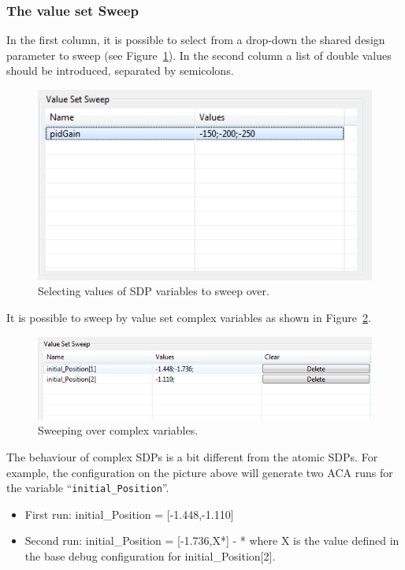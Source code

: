 \documentclass{crescendorepchap}
\begin{document}
\subsubsection{The value set Sweep}

In the first column, it is possible to select from a drop-down the shared
design parameter to sweep (see Figure~\ref{fig:ValueSetSweep}). 
In the second column a list of double values
should be introduced, separated by semicolons.

\begin{figure}[htbp]
\centering
\includegraphics[width=.6\textwidth]{images/ValueSetSweep.png}
\caption{Selecting values of SDP variables to sweep over.\label{fig:ValueSetSweep}}
\end{figure}

\noindent It is possible to sweep by value set complex variables as shown in Figure~\ref{fig:ValueSetSweepComplex}.

\begin{figure}[htbp]
\centering
\includegraphics[width=.6\textwidth]{images/ValueSetSweepComplex.png}
\caption{Sweeping over complex variables.\label{fig:ValueSetSweepComplex}}
\end{figure}

The behaviour of complex SDPs is a bit different from the atomic SDPs.
For example, the configuration on the picture above will generate two ACA
runs for the variable ``\texttt{initial\_Position}''.

\begin{itemize}
\item First run: initial\_Position = {[}-1.448,-1.110{]}

\item Second run: initial\_Position = {[}-1.736,X*{]} - * where X is the value
defined in the base debug configuration for initial\_Position{[}2{]}.
\end{itemize}
\end{document}
